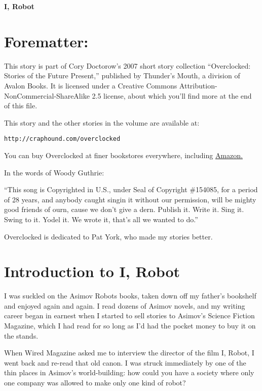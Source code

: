 \newenvironment{robot}{\sc}{}




\begin{center}
\textbf{\huge\textsf{{I, Robot}}}
\end{center}

\section{Forematter:}

This story is part of Cory Doctorow’s 2007 short story collection
“Overclocked: Stories of the Future Present,” published by
Thunder’s Mouth, a division of Avalon Books. It is licensed under a
Creative Commons Attribution-NonCommercial-ShareAlike 2.5 license,
about which you’ll find more at the end of this file.

This story and the other stories in the volume are available at:

\texttt{http://craphound.com/overclocked}

You can buy Overclocked at finer bookstores everywhere, including
\href{http://www.amazon.com/exec/obidos/ASIN/1560259817/downandoutint-20}{Amazon.}

In the words of Woody Guthrie:

“This song is Copyrighted in U.S., under Seal of Copyright
\#154085, for a period of 28 years, and anybody caught singin it
without our permission, will be mighty good friends of ourn, cause
we don’t give a dern. Publish it. Write it. Sing it. Swing to it.
Yodel it. We wrote it, that’s all we wanted to do.”

Overclocked is dedicated to Pat York, who made my stories better.


\section{Introduction to I, Robot}

I was suckled on the Asimov Robots books, taken down off my
father’s bookshelf and enjoyed again and again. I read dozens of
Asimov novels, and my writing career began in earnest when I
started to sell stories to Asimov’s Science Fiction Magazine, which
I had read for so long as I’d had the pocket money to buy it on the
stands.

When Wired Magazine asked me to interview the director of the film
I, Robot, I went back and re-read that old canon. I was struck
immediately by one of the thin places in Asimov’s world-building:
how could you have a society where only one company was allowed to
make only one kind of robot?

